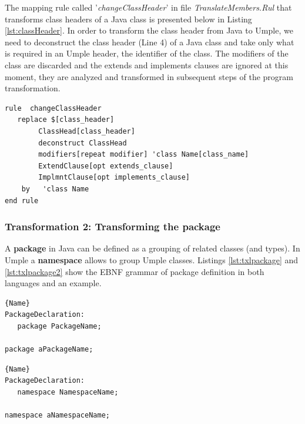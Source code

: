 The mapping rule called '\textit{changeClassHeader}' in file \textit{TranslateMembers.Rul} that transforms class headers of a Java class is presented below in Listing \ref{lst:classHeader}. In order to transform the class header from Java to Umple, we need to deconstruct the class header  (Line 4)  of a Java class and take only what is required in an Umple header, the identifier of the class. The modifiers of the class are discarded and the extends and implements clauses are ignored at this moment, they are analyzed and transformed in subsequent steps of the program transformation. 

\begin{lstlisting}[style=umplePlain, caption=TXL Mapping rule for transforming the class headers, label=lst:classHeader]
rule  changeClassHeader 	
   replace $[class_header] 		
    	ClassHead[class_header] 		
    	deconstruct ClassHead 					
    	modifiers[repeat modifier] 'class Name[class_name] 
        ExtendClause[opt extends_clause] 
        ImplmntClause[opt implements_clause]          
    by 	 'class Name 
end rule

\end{lstlisting}

\subsubsection{Transformation 2: Transforming the package} 

A \textbf{package} in Java can be defined as a grouping of related classes (and types). In Umple a \textbf{namespace} allows to group Umple classes. Listings \ref{lst:txlpackage} and \ref{lst:txlpackage2} show the EBNF grammar of package definition in both languages and an example. 

\noindent\begin{minipage}{.45\textwidth}
\begin{lstlisting}[style=umplePlain,caption=Java Package,label=lst:txlpackage]{Name}
PackageDeclaration:
   package PackageName; 

package aPackageName;
\end{lstlisting}
\end{minipage}\hfill
\begin{minipage}{.45\textwidth}
\begin{lstlisting}[style=umplePlain,caption=Umple Namespace,label=lst:txlpackage2]{Name}
PackageDeclaration:
   namespace NamespaceName;
 
namespace aNamespaceName;
\end{lstlisting}
\end{minipage}


